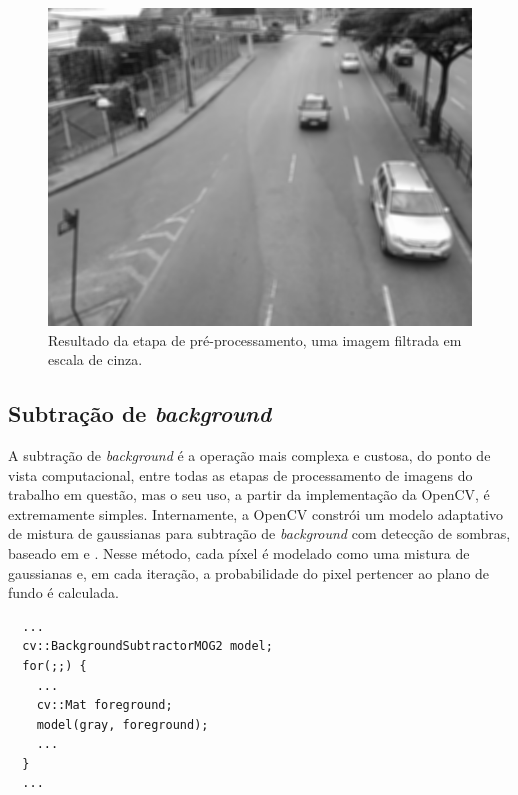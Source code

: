 \begin{figure}[ht]
  \begin{center}
    \includegraphics[scale=0.5]{imgs/gray.png}
  \end{center}
  \caption{Resultado da etapa de pré-processamento, uma imagem filtrada em escala de cinza.}
  \label{fig:pre_processamento}
\end{figure}


\subsection{Subtração de \textit{background}} %
\label{sub:subtra_o_de_background}

A subtração de \textit{background} é a operação mais complexa e custosa, do ponto de vista computacional, entre todas as etapas de processamento de imagens do trabalho em questão, mas o seu uso, a partir da implementação da OpenCV, é extremamente simples. Internamente, a OpenCV constrói um modelo adaptativo de mistura de gaussianas para subtração de \textit{background} com detecção de sombras, baseado em \cite{zivkovic:2004} e \cite{zivkovic:2006}. Nesse método, cada píxel é modelado como uma mistura de gaussianas e, em cada iteração, a probabilidade do pixel pertencer ao plano de fundo é calculada.

\begin{lstlisting}
  ...
  cv::BackgroundSubtractorMOG2 model;
  for(;;) {
    ...
    cv::Mat foreground;
    model(gray, foreground);
    ...
  }
  ...
\end{lstlisting}

